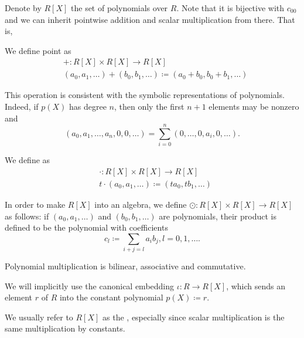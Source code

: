 \begin{definition}\label{def:algebra_of_polynomials}
  Denote by \( R[X] \) the set of polynomials over \( R \). Note that it is bijective with \( c_{00} \) and we can inherit pointwise addition and scalar multiplication from there. That is,

  \begin{defenum}
     We define  point as
    \begin{align*}
      &+: R[X] \times R[X] \to R[X] \\
      &(a_0, a_1, \ldots) + (b_0, b_1, \ldots) \coloneqq (a_0 + b_0, b_0 + b_1, \ldots)
    \end{align*}

    This operation is consistent with the symbolic representations of polynomials. Indeed, if \( p(X) \) has degree \( n \), then only the first \( n + 1 \) elements may be nonzero and
    \begin{equation*}
      (a_0, a_1, \ldots, a_n, 0, 0, \ldots) = \sum_{i=0}^n (0, \ldots, 0, a_i, 0, \ldots).
    \end{equation*}

     We define  as
    \begin{align*}
      &\cdot: R[X] \times R[X] \to R[X] \\
      &t \cdot (a_0, a_1, \ldots) \coloneqq (t a_0, t b_1, \ldots)
    \end{align*}

     In order to make \( R[X] \) into an algebra, we define  \( \odot: R[X] \times R[X] \to R[X] \) as follows: if \( (a_0, a_1, \ldots) \) and \( (b_0, b_1, \ldots) \) are polynomials, their product is defined to be the polynomial with coefficients
    \begin{equation}
      c_l \coloneqq \sum_{i+j=l} a_i b_j, l = 0, 1, \ldots.
    \end{equation}

    Polynomial multiplication is bilinear, associative and commutative.
  \end{defenum}

  We will implicitly use the canonical embedding \( \iota: R \to R[X] \), which sends an element \( r \) of \( R \) into the constant polynomial \( p(X) \coloneqq r \).

  We usually refer to \( R[X] \) as the , especially since scalar multiplication is the same multiplication by constants.
\end{definition}

